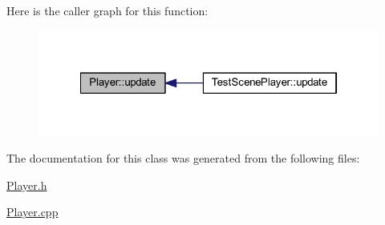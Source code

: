 Here is the caller graph for this function:
\nopagebreak
\begin{figure}[H]
\begin{center}
\leavevmode
\includegraphics[width=322pt]{d8/d53/class_player_a82c3476f3e65a4e2ac6bcd040771bdd4_icgraph}
\end{center}
\end{figure}




The documentation for this class was generated from the following files:\begin{DoxyCompactItemize}
\item 
\hyperlink{_player_8h}{Player.h}\item 
\hyperlink{_player_8cpp}{Player.cpp}\end{DoxyCompactItemize}
